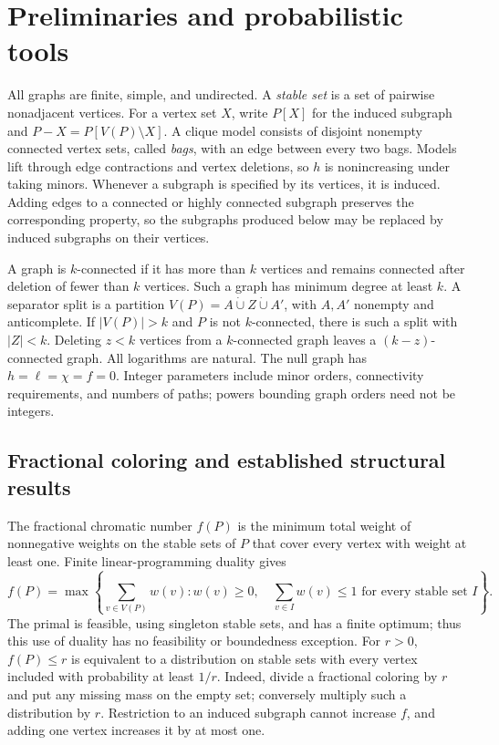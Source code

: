 \section{Preliminaries and probabilistic tools}\label{sec:preliminaries}

All graphs are finite, simple, and undirected. A \emph{stable set} is a set
of pairwise nonadjacent vertices. For a vertex set $X$, write $P[X]$ for
the induced subgraph and $P-X=P[V(P)\setminus X]$. A clique model consists
of disjoint nonempty connected vertex sets, called \emph{bags}, with an
edge between every two bags. Models lift through edge contractions and
vertex deletions, so $h$ is nonincreasing under taking minors. Whenever
a subgraph is specified by its vertices, it is induced. Adding edges to
a connected or highly connected subgraph preserves the corresponding
property, so the subgraphs produced below may be replaced by induced
subgraphs on their vertices.

A graph is $k$-connected if it has more than $k$ vertices and remains
connected after deletion of fewer than $k$ vertices. Such a graph has
minimum degree at least $k$. A separator split is a partition
$V(P)=A\mathbin{\dot\cup}Z\mathbin{\dot\cup}A'$, with $A,A'$ nonempty
and anticomplete. If $|V(P)|>k$ and $P$ is not $k$-connected, there is such
a split with $|Z|<k$. Deleting $z<k$ vertices from a $k$-connected graph
leaves a $(k-z)$-connected graph. All logarithms are natural. The null
graph has $h=\ell=\chi=f=0$. Integer parameters include minor orders,
connectivity requirements, and numbers of paths; powers bounding graph
orders need not be integers.

\subsection{Fractional coloring and established structural results}

The fractional chromatic number $f(P)$ is the minimum total weight of
nonnegative weights on the stable sets of $P$ that cover every vertex
with weight at least one. Finite linear-programming duality
\cite{galekuhntucker1951} gives
\begin{equation}\label{eq:fractional-dual}
 f(P)=\max\left\{\sum_{v\in V(P)}w(v):
 w(v)\ge0,\quad \sum_{v\in I}w(v)\le1
 \text{ for every stable set }I\right\}.
\end{equation}
The primal is feasible, using singleton stable sets, and has a finite
optimum; thus this use of duality has no feasibility or boundedness
exception. For $r>0$, $f(P)\le r$ is equivalent to a distribution on stable
sets with every vertex included with probability at least $1/r$.
Indeed, divide a fractional coloring by $r$ and put any missing mass on
the empty set; conversely multiply such a distribution by $r$.
Restriction to an induced subgraph cannot increase $f$, and adding one
vertex increases it by at most one.

